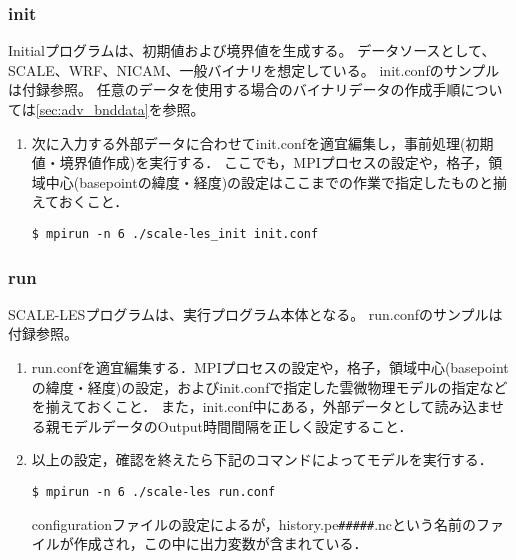 \subsubsection{init}

Initialプログラムは、初期値および境界値を生成する。
データソースとして、SCALE、WRF、NICAM、一般バイナリを想定している。
init.confのサンプルは付録参照。
任意のデータを使用する場合のバイナリデータの作成手順については\ref{sec:adv_bnddata}を参照。

\begin{enumerate}
\item 次に入力する外部データに合わせてinit.confを適宜編集し，事前処理(初期値・境界値作成)を実行する．
ここでも，MPIプロセスの設定や，格子，領域中心(basepointの緯度・経度)の設定はここまでの作業で指定したものと揃えておくこと．
\begin{verbatim}
$ mpirun -n 6 ./scale-les_init init.conf
\end{verbatim}
\end{enumerate}



\subsubsection{run}
SCALE-LESプログラムは、実行プログラム本体となる。
run.confのサンプルは付録参照。


\begin{enumerate}
\item run.confを適宜編集する．MPIプロセスの設定や，格子，領域中心(basepointの緯度・経度)の設定，およびinit.confで指定した雲微物理モデルの指定などを揃えておくこと．
また，init.conf中にある，外部データとして読み込ませる親モデルデータのOutput時間間隔を正しく設定すること．

\item 以上の設定，確認を終えたら下記のコマンドによってモデルを実行する．
\begin{verbatim}
$ mpirun -n 6 ./scale-les run.conf
\end{verbatim}
configurationファイルの設定によるが，history.pe\verb|#####|.ncという名前のファイルが作成され，この中に出力変数が含まれている．
\end{enumerate}



